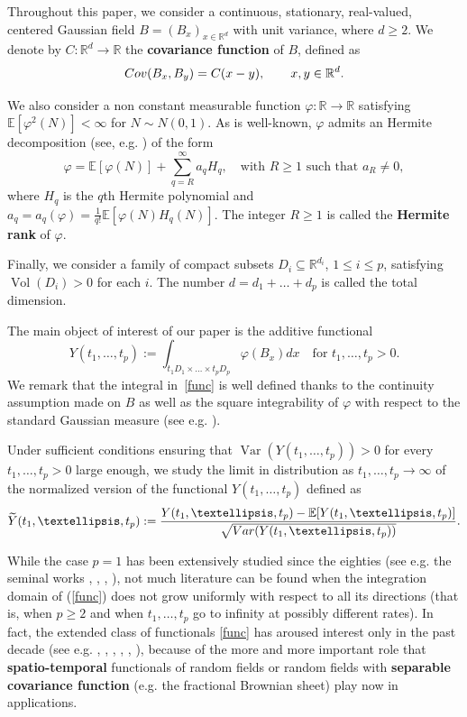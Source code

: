 \documentclass[12pt]{article}
\DeclareMathOperator{\var}{Var}
\DeclareMathOperator{\1}{1}
\DeclareMathOperator{\vol}{Vol}
\newcommand{\R}{\mathbb{R}}
\newcommand{\E}{\mathbb{E}}
\theoremstyle{plain}
\theoremstyle{definition}
\begin{document}
Throughout this paper, we consider a continuous, stationary, real-valued, centered Gaussian field $B=(B_{x})_{x\in \R^d}$ with unit variance, where $d\geq 2$. We denote by $C:\R^d\rightarrow\R$ the \textbf{covariance function} of $B$, defined as
$$
{\rm Cov}(B_x,B_y)=C(x-y),\quad \quad x,y\in \R^{d}.
$$

We also consider a non constant measurable function $\varphi:\R\rightarrow\R$ satisfying $\E[\varphi^2(N)]<\infty$ for $N\sim N(0,1)$. 
As is well-known, $\varphi$ admits an Hermite decomposition (see, e.g. \cite[Section 1.4]{bluebook}) of the form
\begin{equation}\label{hermitedecomp}
\varphi =\E[\varphi(N)]+ \sum_{q=R}^\infty a_q H_q,\quad \mbox{with $R\geq 1$ such that $a_R\neq 0$},
\end{equation}
where $H_q$ is the $q$th Hermite polynomial and $a_q=a_q(\varphi)=\frac{1}{q!}\mathbb{E}\left[\varphi(N)H_q(N)\right]$.
The integer $R\geq 1$ is called the {\bf Hermite rank} of $\varphi$.

Finally, we consider a family of compact subsets $D_i\subseteq\R^{d_i}$, $1\leq i\leq p$, satisfying $\vol(D_i)>0$ for each $i$. The number $d= d_1+\dots+d_{p}$ is called the total dimension.

The main object of interest of our paper is the additive functional 
\begin{equation}
    \label{func}
    Y(t_1,\dots,t_p):=\int_{ t_1D_1\times\dots \times t_pD_p}\varphi(B_{x})dx\quad\mbox{for $t_1,\dots,t_p>0$}.
\end{equation}
We remark that the integral in~\eqref{func} is well defined thanks to the continuity assumption made on $B$ as well as the square integrability of $\varphi$ with respect to the standard Gaussian measure (see e.g. \cite[Proposition 3]{MN22}). 


Under sufficient conditions ensuring that $\var(Y(t_1,\ldots,t_p))>0$ for every $t_1,\ldots,t_p>0$ large enough, we study the limit in distribution as $t_1,\ldots,t_p\to\infty$ of the normalized version of the functional $Y(t_1,\ldots,t_p)$ defined as
\begin{equation}
    \label{mainquestion}
    \widetilde{Y}(t_1,\ldots,t_p):=\frac{Y({t_1,\ldots,t_p})-\E[Y({t_1,\ldots,t_p})]}{\sqrt{{\rm Var}(Y(t_1,\ldots,t_p))}}.
\end{equation}

    

While the case $p=1$ has been extensively studied since the eighties (see e.g. the seminal works \cite{BM83}, \cite{DM79}, \cite{R60}, \cite{T79}), not much literature can be found when the integration domain of (\ref{func}) does not grow uniformly with respect to all its directions (that is, when $p\geq 2$ and when $t_1,\ldots,t_p$ go to infinity at possibly different rates). In fact, the extended class of functionals \eqref{func} has aroused interest only in the past decade (see e.g. \cite{RST}, \cite{PR16}, \cite{B11}, \cite{LRM23}, \cite{AO17}, \cite{PS17}), because of the more and more important role that \textbf{spatio-temporal} functionals of random fields or random fields with {\bf separable covariance function} (e.g. the fractional Brownian sheet) play now in applications. 
\end{document}
